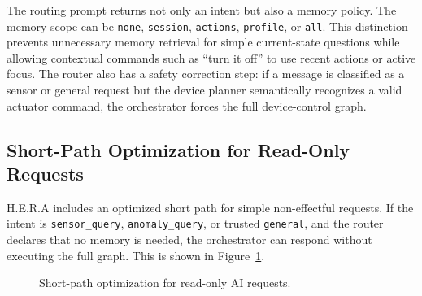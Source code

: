 The routing prompt returns not only an intent but also a memory policy. The memory scope can be \texttt{none}, \texttt{session}, \texttt{actions}, \texttt{profile}, or \texttt{all}. This distinction prevents unnecessary memory retrieval for simple current-state questions while allowing contextual commands such as ``turn it off'' to use recent actions or active focus. The router also has a safety correction step: if a message is classified as a sensor or general request but the device planner semantically recognizes a valid actuator command, the orchestrator forces the full device-control graph.

\subsection{Short-Path Optimization for Read-Only Requests}

H.E.R.A includes an optimized short path for simple non-effectful requests. If the intent is \texttt{sensor\_query}, \texttt{anomaly\_query}, or trusted \texttt{general}, and the router declares that no memory is needed, the orchestrator can respond without executing the full graph. This is shown in Figure~\ref{fig:hera-shortpath}.

\begin{figure}[H]
    \centering
    \caption{Short-path optimization for read-only AI requests.}
    \label{fig:hera-shortpath}
\end{figure}

